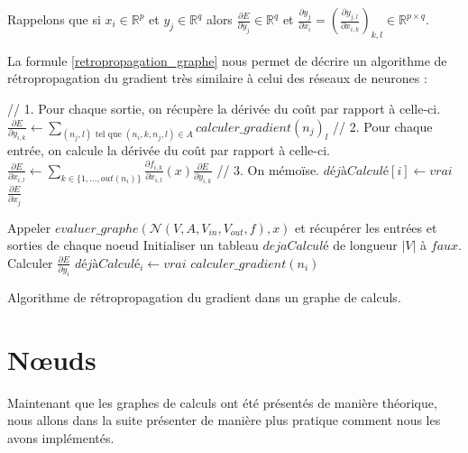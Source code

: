 Rappelons que si $x_i \in \mathbb{R}^p$ et $y_j \in \mathbb{R}^q$ alors $\frac{\partial E}{\partial y_j} \in \mathbb{R}^q$ et $\frac{\partial y_j}{\partial x_i} = (\frac{\partial y_{j,l}}{\partial x_{i, k}})_{k, l} \in \mathbb{R}^{p \times q}$.

La formule \ref{retropropagation_graphe} nous permet de décrire un algorithme de rétropropagation du gradient très similaire à celui des réseaux de neurones :

\begin{algorithm} 
\begin{algorithmic}
		\State // 1. Pour chaque sortie, on récupère la dérivée du coût par rapport à celle-ci.
			\State $\frac{\partial E}{\partial y_{i, k}} \leftarrow \sum\limits_{(n_j, l)\text{ tel que }(n_i, k, n_j, l) \in A}{calculer\_gradient(n_j)_l}$
		\EndFor
		\State // 2. Pour chaque entrée, on calcule la dérivée du coût par rapport à celle-ci.
			\State $\frac{\partial E}{\partial x_{i, l}} \leftarrow \sum\limits_{k \in \{1, ..., out(n_i) \}}{\frac{\partial f_{i, k}}{\partial x_{i, l}}(x)\frac{\partial E}{\partial y_{i, k}}}$
		\EndFor
		\State // 3. On mémoïse.
		\State $déjàCalculé[i] \leftarrow vrai$
	\EndIf
	\State \Return $\frac{\partial E}{\partial x_j}$
\EndFunction

\State Appeler $evaluer\_graphe(\mathcal{N}(V, A, V_{in}, V_{out}, f), x)$ et récupérer les entrées et sorties de chaque noeud
\State Initialiser un tableau $dejaCalculé$ de longueur $|V|$ à $faux$.
	\State Calculer $\frac{\partial E}{\partial y_i}$
	\State $déjàCalculé_i \leftarrow vrai$ 
\EndFor
{}
	\State $calculer\_gradient(n_i)$ 
\EndFor
\EndProcedure
\end{algorithmic} 
\caption{Algorithme de rétropropagation du gradient dans un graphe de calculs.}
\label{propagation_memoisation2}
\end{algorithm}

\section{N\oe{}uds}

Maintenant que les graphes de calculs ont été présentés de manière théorique, nous allons dans la suite présenter de manière plus pratique comment nous les avons implémentés.

